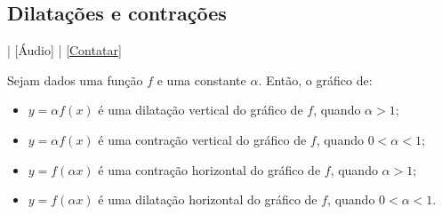 \subsection{Dilatações e contrações}

\begin{flushright}
  [Vídeo] | [Áudio] | \href{https://phkonzen.github.io/notas/contato.html}{[Contatar]}
\end{flushright}

Sejam dados uma função $f$ e uma constante $\alpha$. Então, o gráfico de:
\begin{itemize}
\item $y = \alpha f(x)$ é uma dilatação vertical do gráfico de $f$, quando $\alpha > 1$;
\item $y = \alpha f(x)$ é uma contração vertical do gráfico de $f$, quando $0<\alpha < 1$;
\item $y = f(\alpha x)$ é uma contração horizontal do gráfico de $f$, quando $\alpha > 1$;
\item $y = f(\alpha x)$ é uma dilatação horizontal do gráfico de $f$, quando $0<\alpha < 1$.
\end{itemize}

